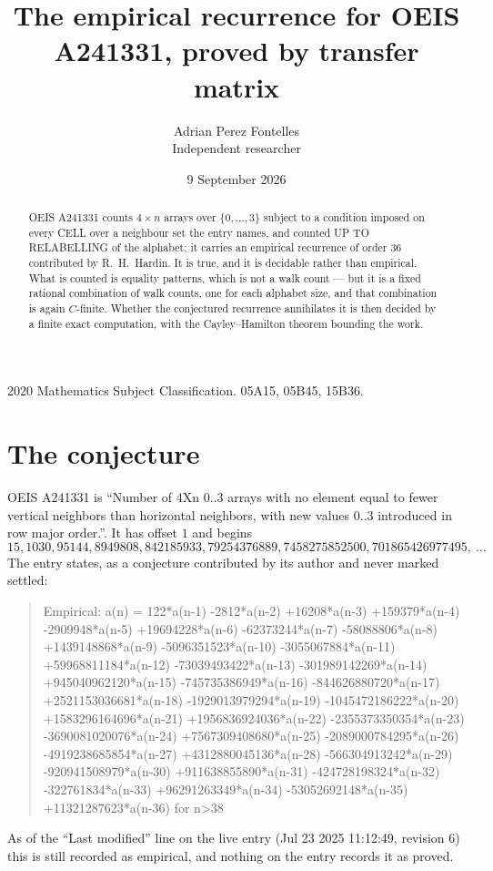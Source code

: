 \documentclass[11pt,a4paper]{article}
\title{The empirical recurrence for OEIS A241331, proved by transfer matrix}
\author{Adrian Perez Fontelles\\ \small Independent researcher}
\date{9 September 2026}
\theoremstyle{plain}
\theoremstyle{definition}
\begin{document}
\maketitle

\begin{abstract}
OEIS A241331 counts $4\times n$ arrays over $\{0,\dots,3\}$ subject to a condition imposed on
every CELL over a neighbour set the entry names, and counted UP TO RELABELLING of the
alphabet; it carries an empirical recurrence of order $36$ contributed by
R.~H.~Hardin. It is true, and it is decidable rather than empirical. What is counted is
equality patterns, which is not a walk count --- but it is a fixed rational combination of
walk counts, one for each alphabet size, and that combination is again $C$-finite. Whether the
conjectured recurrence annihilates it is then decided by a finite exact computation, with the
Cayley--Hamilton theorem bounding the work.
\end{abstract}

\noindent\small 2020 Mathematics Subject Classification. 05A15, 05B45, 15B36.\normalsize

\section{The conjecture}

OEIS A241331 is ``Number of 4Xn 0..3 arrays with no element equal to fewer vertical neighbors than horizontal neighbors, with new values 0..3 introduced in row major order.''. It has offset $1$ and begins
\[
15, 1030, 95144, 8949808, 842185933, 79254376889, 7458275852500, 701865426977495,\ \dots
\]
The entry states, as a conjecture contributed by its author and never marked settled:
\begin{quote}
Empirical: a(n) = 122*a(n-1) -2812*a(n-2) +16208*a(n-3) +159379*a(n-4) -2909948*a(n-5) +19694228*a(n-6) -62373244*a(n-7) -58088806*a(n-8) +1439148868*a(n-9) -5096351523*a(n-10) -3055067884*a(n-11) +59968811184*a(n-12) -73039493422*a(n-13) -301989142269*a(n-14) +945040962120*a(n-15) -745735386949*a(n-16) -844626880720*a(n-17) +2521153036681*a(n-18) -1929013979294*a(n-19) -1045472186222*a(n-20) +1583296164696*a(n-21) +1956836924036*a(n-22) -2355373350354*a(n-23) -3690081020076*a(n-24) +7567309408680*a(n-25) -2089000784295*a(n-26) -4919238685854*a(n-27) +4312880045136*a(n-28) -566304913242*a(n-29) -920941508979*a(n-30) +911638855890*a(n-31) -424728198324*a(n-32) -322761834*a(n-33) +96291263349*a(n-34) -53052692148*a(n-35) +11321287623*a(n-36) for n>38
\end{quote}
As of the ``Last modified'' line on the live entry (Jul 23 2025 11:12:49, revision 6) this is still
recorded as empirical, and nothing on the entry records it as proved.
\end{document}
